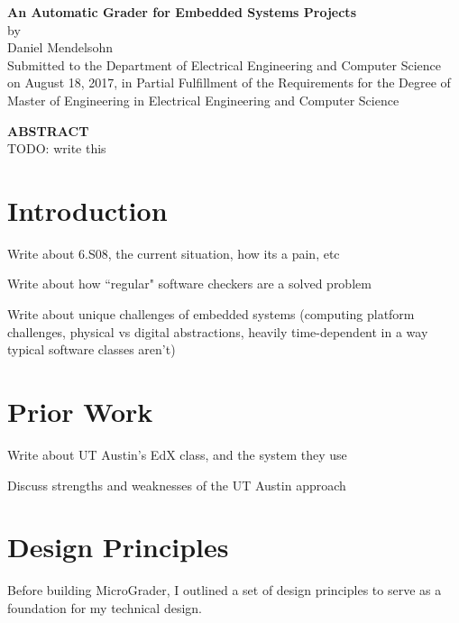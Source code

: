 \documentclass[12pt]{article}
\newcommand{\mytitle}{\textbf{An Automatic Grader for Embedded Systems Projects}}
\newcommand{\mydate}{August 18, 2017}
\begin{document}
\addtocounter{page}{1}

\newpage
\mbox{}
\newpage

\begin{center}
\mytitle \\
by \\
Daniel Mendelsohn \\
\vspace{12pt}
Submitted to the Department of Electrical Engineering and Computer Science\\
 on \mydate{}, in Partial Fulfillment of the Requirements for the Degree of\\
 Master of Engineering in Electrical Engineering and Computer Science
\end{center}
\vspace{12pt}
\textbf{ABSTRACT} \\

\noindent TODO: write this

\newpage
\mbox{}
\newpage

\tableofcontents

\doublespacing

\newpage
\section{Introduction}
Write about 6.S08, the current situation, how its a pain, etc

Write about how ``regular" software checkers are a solved problem

Write about unique challenges of embedded systems (computing platform challenges, physical vs digital abstractions, heavily time-dependent in a way typical software classes aren't)

\newpage
\section{Prior Work}
Write about UT Austin's EdX class, and the system they use

Discuss strengths and weaknesses of the UT Austin approach

\newpage
\section{Design Principles}
Before building MicroGrader, I outlined a set of design principles to serve as a foundation for my technical design.
\end{document}
